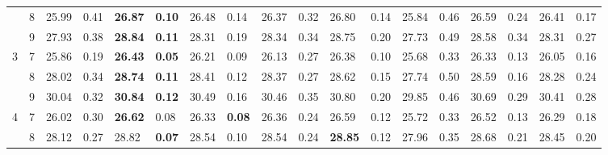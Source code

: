 \documentclass[conference]{IEEEtran}
\begin{document}
\begin{table}[]
\begin{tabular}{|cc|ll|ll|ll|ll|ll|ll|ll|ll|}
		\multicolumn{1}{|c|}{} & 8 & \multicolumn{1}{l|}{25.99} & 0.41 & \multicolumn{1}{l|}{\textbf{26.87}} & \textbf{0.10} & \multicolumn{1}{l|}{26.48} & 0.14 & \multicolumn{1}{l|}{26.37} & 0.32 & \multicolumn{1}{l|}{26.80} & 0.14 & \multicolumn{1}{l|}{25.84} & 0.46 & \multicolumn{1}{l|}{26.59} & 0.24 & \multicolumn{1}{l|}{26.41} & 0.17 \\ \cline{2-18} 
		\multicolumn{1}{|c|}{} & 9 & \multicolumn{1}{l|}{27.93} & 0.38 & \multicolumn{1}{l|}{\textbf{28.84}} & \textbf{0.11} & \multicolumn{1}{l|}{28.31} & 0.19 & \multicolumn{1}{l|}{28.34} & 0.34 & \multicolumn{1}{l|}{28.75} & 0.20 & \multicolumn{1}{l|}{27.73} & 0.49 & \multicolumn{1}{l|}{28.58} & 0.34 & \multicolumn{1}{l|}{28.31} & 0.27 \\ \hline
		\multicolumn{1}{|c|}{\multirow{3}{*}{3}} & 7 & \multicolumn{1}{l|}{25.86} & 0.19 & \multicolumn{1}{l|}{\textbf{26.43}} & \textbf{0.05} & \multicolumn{1}{l|}{26.21} & 0.09 & \multicolumn{1}{l|}{26.13} & 0.27 & \multicolumn{1}{l|}{26.38} & 0.10 & \multicolumn{1}{l|}{25.68} & 0.33 & \multicolumn{1}{l|}{26.33} & 0.13 & \multicolumn{1}{l|}{26.05} & 0.16 \\ \cline{2-18} 
		\multicolumn{1}{|c|}{} & 8 & \multicolumn{1}{l|}{28.02} & 0.34 & \multicolumn{1}{l|}{\textbf{28.74}} & \textbf{0.11} & \multicolumn{1}{l|}{28.41} & 0.12 & \multicolumn{1}{l|}{28.37} & 0.27 & \multicolumn{1}{l|}{28.62} & 0.15 & \multicolumn{1}{l|}{27.74} & 0.50 & \multicolumn{1}{l|}{28.59} & 0.16 & \multicolumn{1}{l|}{28.28} & 0.24 \\ \cline{2-18} 
		\multicolumn{1}{|c|}{} & 9 & \multicolumn{1}{l|}{30.04} & 0.32 & \multicolumn{1}{l|}{\textbf{30.84}} & \textbf{0.12} & \multicolumn{1}{l|}{30.49} & 0.16 & \multicolumn{1}{l|}{30.46} & 0.35 & \multicolumn{1}{l|}{30.80} & 0.20 & \multicolumn{1}{l|}{29.85} & 0.46 & \multicolumn{1}{l|}{30.69} & 0.29 & \multicolumn{1}{l|}{30.41} & 0.28 \\ \hline
		\multicolumn{1}{|c|}{\multirow{3}{*}{4}} & 7 & \multicolumn{1}{l|}{26.02} & 0.30 & \multicolumn{1}{l|}{\textbf{26.62}} & 0.08 & \multicolumn{1}{l|}{26.33} & \textbf{0.08} & \multicolumn{1}{l|}{26.36} & 0.24 & \multicolumn{1}{l|}{26.59} & 0.12 & \multicolumn{1}{l|}{25.72} & 0.33 & \multicolumn{1}{l|}{26.52} & 0.13 & \multicolumn{1}{l|}{26.29} & 0.18 \\ \cline{2-18} 
		\multicolumn{1}{|c|}{} & 8 & \multicolumn{1}{l|}{28.12} & 0.27 & \multicolumn{1}{l|}{28.82} & \textbf{0.07} & \multicolumn{1}{l|}{28.54} & 0.10 & \multicolumn{1}{l|}{28.54} & 0.24 & \multicolumn{1}{l|}{\textbf{28.85}} & 0.12 & \multicolumn{1}{l|}{27.96} & 0.35 & \multicolumn{1}{l|}{28.68} & 0.21 & \multicolumn{1}{l|}{28.45} & 0.20 \\ \cline{2-18} 

\end{tabular}
\end{table}
\end{document}
